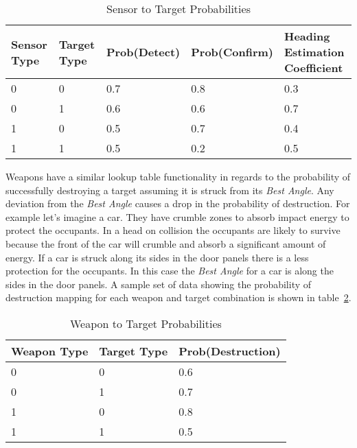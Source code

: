 \begin{table}[h]
	\caption{Sensor to Target Probabilities}
	\centering
	\label{tab:snsrTgtProb}
	\begin{tabular}{|p{1cm}|p{1cm}|p{1cm}|p{1cm}|p{1cm}|}
		\hline
		Sensor Type & Target Type & Prob(Detect) & Prob(Confirm) & Heading Estimation Coefficient\\ \hline
		0 & 0 & 0.7 & 0.8 & 0.3 \\
		0 & 1 & 0.6 & 0.6 & 0.7 \\
		1 & 0 & 0.5 & 0.7 & 0.4 \\
		1 & 1 & 0.5 & 0.2 & 0.5 \\
		\hline
	\end{tabular}
\end{table}

Weapons have a similar lookup table functionality in regards to the probability of successfully destroying a target assuming it is struck from its \textit{Best Angle}.  Any deviation from the \textit{Best Angle} causes a drop in the probability of destruction.  For example let's imagine a car.  They have crumble zones to absorb impact energy to protect the occupants.  In a head on collision the occupants are likely to survive because the front of the car will crumble and absorb a significant amount of energy.  If a car is struck along its sides in the door panels there is a less protection for the occupants.  In this case the \textit{Best Angle} for a car is along the sides in the door panels. A sample set of data showing the probability of destruction mapping for each weapon and target combination is shown in table~\ref{tab:wpnTgtProb}.

\begin{table}[h]
	\caption{Weapon to Target Probabilities}
	\centering
	\label{tab:wpnTgtProb}
	\begin{tabular}{|p{1.5cm}|p{1.5cm}|p{3cm}|}
		\hline
		Weapon Type & Target Type & Prob(Destruction)\\ \hline
		0 & 0 & 0.6 \\
		0 & 1 & 0.7 \\
		1 & 0 & 0.8 \\
		1 & 1 & 0.5 \\
		\hline
	\end{tabular}
\end{table}




